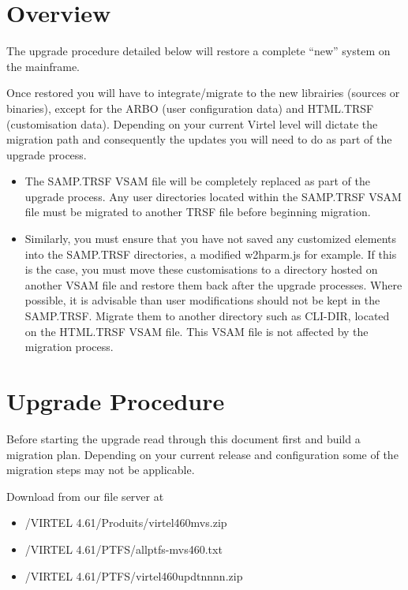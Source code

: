 \documentclass[letterpaper,10pt,english]{sphinxmanual}
\begin{document}
\section{Overview}
\label{\detokenize{Migration_Guide:overview}}
The upgrade procedure detailed below will restore a complete “new” system on the mainframe.

Once restored you will have to integrate/migrate to the new librairies (sources or binaries), except for the ARBO (user configuration data) and HTML.TRSF (customisation data). Depending on your current Virtel level will dictate the migration path and consequently the updates you will need to do as part of the upgrade process.
\begin{itemize}
\item {} 
The SAMP.TRSF VSAM file will be completely replaced as part of the upgrade process. Any user directories located within the SAMP.TRSF VSAM file must be migrated to another TRSF file before beginning migration.

\item {} 
Similarly, you must ensure that you have not saved any customized elements into the SAMP.TRSF directories, a modified w2hparm.js for example. If this is the case, you must move these customisations to a directory hosted on another VSAM file and restore them back after the upgrade processes. Where possible, it is advisable than user modifications should not be kept in the SAMP.TRSF. Migrate them to another directory such as CLI-DIR, located on the HTML.TRSF VSAM file. This VSAM file is not affected by the migration process.

\end{itemize}

\newpage

\ignorespaces 

\section{Upgrade Procedure}
\label{\detokenize{Migration_Guide:upgrade-procedure}}\label{\detokenize{Migration_Guide:index-1}}
Before starting the upgrade read through this document first and build a migration plan. Depending on your current release and configuration some of the migration steps may not be applicable.

Download from our file server at 
\begin{itemize}
\item {} 
/VIRTEL 4.61/Produits/virtel460mvs.zip

\item {} 
/VIRTEL 4.61/PTFS/allptfs-mvs460.txt

\item {} 
/VIRTEL 4.61/PTFS/virtel460updtnnnn.zip

\end{itemize}
\end{document}
